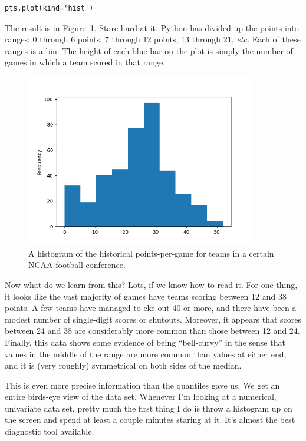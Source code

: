 \begin{Verbatim}[fontsize=\small,samepage=true,frame=single,framesep=3mm]
pts.plot(kind='hist')
\end{Verbatim}

The result is in Figure~\ref{fig:ncaa1}. Stare hard at it. Python has divided
up the points into ranges: 0 through 6 points, 7 through 12 points, 13 through
21, \textit{etc.} Each of these ranges is a bin. The height of each blue bar on
the plot is simply the number of games in which a team scored in that range.

\begin{figure}[ht]
\centering
\includegraphics[width=0.9\textwidth]{ncaa1.png}
\caption{A histogram of the historical points-per-game for teams in a certain
NCAA football conference.}
\label{fig:ncaa1}
\end{figure}

Now what do we learn from this? Lots, if we know how to read it. For one thing,
it looks like the vast majority of games have teams scoring between 12 and 38
points. A few teams have managed to eke out 40 or more, and there have been a
modest number of single-digit scores or shutouts. Moreover, it appears that
scores between 24 and 38 are considerably more common than those between 12 and
24. Finally, this data shows some evidence of being ``bell-curvy'' in the sense
that values in the middle of the range are more common than values at either
end, and it is (very roughly) symmetrical on both sides of the median.

This is even more precise information than the quantiles gave us. We get an
entire birds-eye view of the data set. Whenever I'm looking at a numerical,
univariate data set, pretty much the first thing I do is throw a histogram up
on the screen and spend at least a couple minutes staring at it. It's almost
the best diagnostic tool available.

